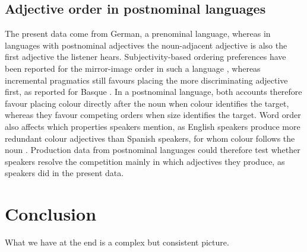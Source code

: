 \documentclass[10pt,a4paper,fleqn]{article}
\begin{document}
\subsection{Adjective order in postnominal languages}

The present data come from German, a prenominal language, whereas in languages with postnominal adjectives the noun-adjacent adjective is also the first adjective the listener hears.
Subjectivity-based ordering preferences have been reported for the mirror-image order in such a language \citep{trainin2023subjectivity}, whereas incremental pragmatics still favours placing the more discriminating adjective first, as reported for Basque \citep[p.~47]{fukumura2018ordering}.
In a postnominal language, both accounts therefore favour placing colour directly after the noun when colour identifies the target, whereas they favour competing orders when size identifies the target.
Word order also affects which properties speakers mention, as English speakers produce more redundant colour adjectives than Spanish speakers, for whom colour follows the noun \citep{rubio2021wordorder,waldon2021modeling}.
Production data from postnominal languages could therefore test whether speakers resolve the competition mainly in which adjectives they produce, as speakers did in the present data.

\section{Conclusion}
\label{sec:conclusion}

What we have at the end is a complex but consistent picture.
\end{document}
